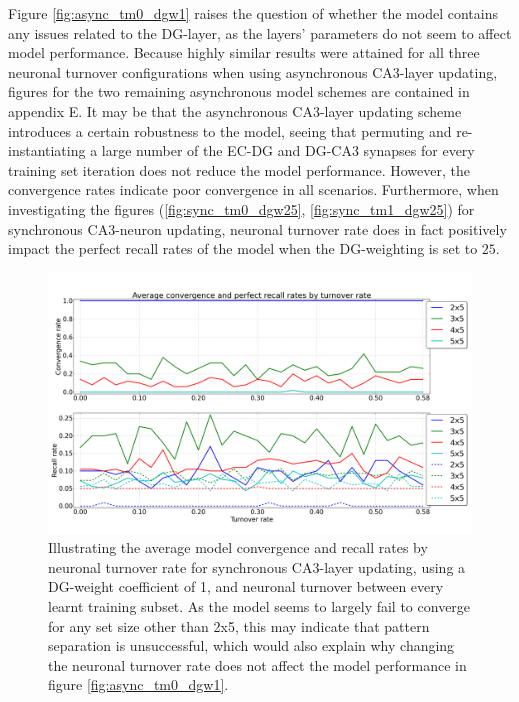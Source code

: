 Figure \ref{fig:async_tm0_dgw1} raises the question of whether the model contains any issues related to the DG-layer, as the layers' parameters do not seem to affect model performance. Because highly similar results were attained for all three neuronal turnover configurations when using asynchronous CA3-layer updating, figures for the two remaining asynchronous model schemes are contained in appendix E.
It may be that the asynchronous CA3-layer updating scheme introduces a certain robustness to the model, seeing that permuting and re-instantiating a large number of the EC-DG and DG-CA3 synapses for every training set iteration does not reduce the model performance. 
However, the convergence rates indicate poor convergence in all scenarios. Furthermore, when investigating the figures (\ref{fig:sync_tm0_dgw25}, \ref{fig:sync_tm1_dgw25}) for synchronous CA3-neuron updating, neuronal turnover rate does in fact positively impact the perfect recall rates of the model when the DG-weighting is set to $25$.

\begin{figure}
    \centering
    \includegraphics[width=13cm]{fig/turnover_rates/sync_tm0_dgw1}
    \caption{Illustrating the average model convergence and recall rates by neuronal turnover rate for synchronous CA3-layer updating, using a DG-weight coefficient of 1, and neuronal turnover between every learnt training subset. As the model seems to largely fail to converge for any set size other than 2x5, this may indicate that pattern separation is unsuccessful, which would also explain why changing the neuronal turnover rate does not affect the model performance in figure \ref{fig:async_tm0_dgw1}.}
    \label{fig:sync_tm0_dgw1}
\end{figure}

